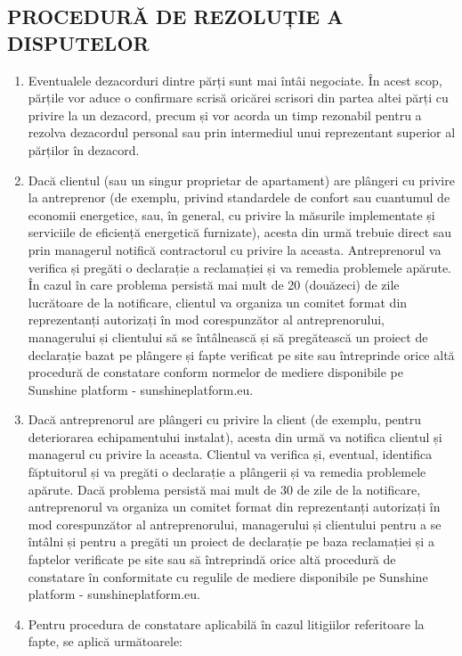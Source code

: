 \begin{multicols}{2}
\subsection{PROCEDURĂ DE REZOLUȚIE A DISPUTELOR}
\begin{enumerate}
\item Eventualele dezacorduri dintre părți sunt mai întâi negociate. În acest scop, părțile vor aduce o confirmare scrisă oricărei scrisori din partea altei părți cu privire la un dezacord, precum și vor acorda un timp rezonabil pentru a rezolva dezacordul personal sau prin intermediul unui reprezentant superior al părților în dezacord.
\item Dacă clientul (sau un singur proprietar de apartament) are plângeri cu privire la antreprenor (de exemplu, privind standardele de confort sau cuantumul de economii energetice, sau, în general, cu privire la măsurile implementate și serviciile de eficiență energetică furnizate), acesta din urmă trebuie direct sau prin managerul notifică contractorul cu privire la aceasta. Antreprenorul va verifica și pregăti o declarație a reclamației și va remedia problemele apărute. În cazul în care problema persistă mai mult de 20 (douăzeci) de zile lucrătoare de la notificare, clientul va organiza un comitet format din reprezentanți autorizați în mod corespunzător al antreprenorului, managerului și clientului să se întâlnească și să pregătească un proiect de declarație bazat pe plângere și fapte verificat pe site sau întreprinde orice altă procedură de constatare conform normelor de mediere disponibile pe Sunshine platform - sunshineplatform.eu.
\item Dacă antreprenorul are plângeri cu privire la client (de exemplu, pentru deteriorarea echipamentului instalat), acesta din urmă va notifica clientul și managerul cu privire la aceasta. Clientul va verifica și, eventual, identifica făptuitorul și va pregăti o declarație a plângerii și va remedia problemele apărute. Dacă problema persistă mai mult de 30 de zile de la notificare, antreprenorul va organiza un comitet format din reprezentanți autorizați în mod corespunzător al antreprenorului, managerului și clientului pentru a se întâlni și pentru a pregăti un proiect de declarație pe baza reclamației și a faptelor verificate pe site sau să întreprindă orice altă procedură de constatare în conformitate cu regulile de mediere disponibile pe Sunshine platform - sunshineplatform.eu.
\item Pentru procedura de constatare aplicabilă în cazul litigiilor referitoare la fapte, se aplică următoarele:

\end{enumerate}
\end{multicols}
